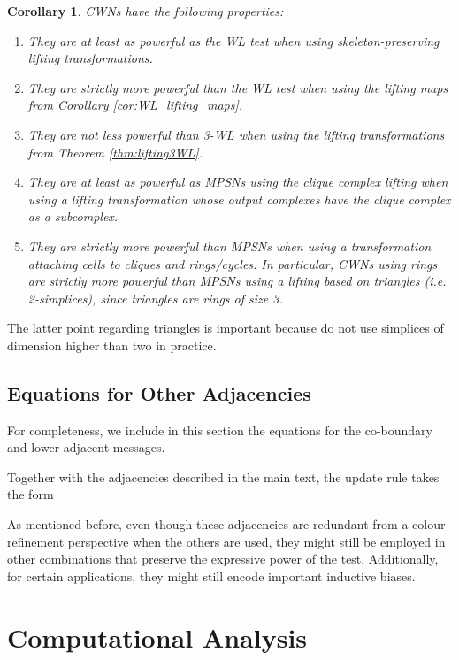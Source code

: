 \documentclass{article}
\newtheorem{corollary}[theorem]{Corollary}
\begin{document}
\begin{corollary}
CWNs have the following properties:
\begin{enumerate}[leftmargin=*]
    \item They are at least as powerful as the WL test when using skeleton-preserving lifting transformations. 
    \item They are strictly more powerful than the WL test when using the lifting maps from Corollary \ref{cor:WL_lifting_maps}.
    \item They are not less powerful than 3-WL when using the lifting transformations from Theorem \ref{thm:lifting3WL}. 
    \item They are at least as powerful as MPSNs using the clique complex lifting \citep{bodnar2021weisfeiler} when using a lifting transformation whose output complexes have the clique complex as a subcomplex. 
    \item They are strictly more powerful than MPSNs when using a transformation attaching cells to cliques and rings/cycles. In particular, CWNs using rings are strictly more powerful than MPSNs using a lifting based on triangles (i.e. 2-simplices), since triangles are rings of size 3. 
\end{enumerate}
\end{corollary}

The latter point regarding triangles is important because \citet{bodnar2021weisfeiler} do not use simplices of dimension higher than two in practice.  

\subsection{Equations for Other Adjacencies}

For completeness, we include in this section the equations for the co-boundary and lower adjacent messages.

Together with the adjacencies described in the main text, the update rule takes the form  

As mentioned before, even though these adjacencies are redundant from a colour refinement perspective when the others are used, they might still be employed in other combinations that preserve the expressive power of the test. Additionally, for certain applications, they might still encode important inductive biases. 

\section{Computational Analysis}
\label{app:complexity}
\end{document}
